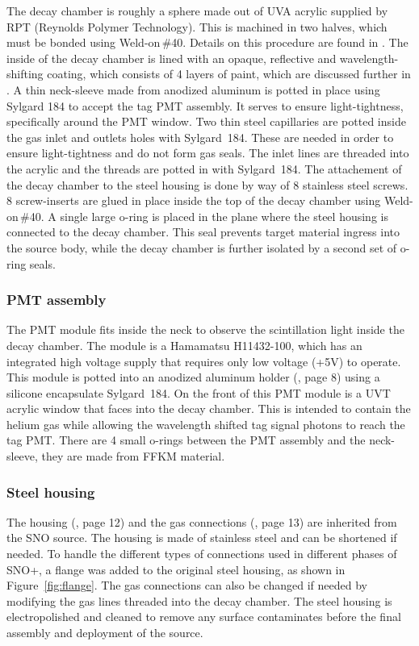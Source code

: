 The decay chamber is roughly a sphere made out of UVA acrylic supplied by RPT (Reynolds Polymer Technology). 
This is machined in two halves, which must be bonded using Weld-on\,\#40. Details on this procedure are found in .
The inside of the decay chamber is lined with an opaque, reflective and wavelength-shifting coating, which consists of 4 layers of paint, which are discussed further in .
A thin neck-sleeve made from anodized aluminum is potted in place using Sylgard 184 to accept the tag PMT assembly. 
It serves to ensure light-tightness, specifically around the PMT window.
Two thin steel capillaries are potted inside the gas inlet and outlets holes with Sylgard~184. These are needed in order to ensure light-tightness and do not form gas seals. The inlet lines are threaded into the acrylic and the threads are potted in with Sylgard~184. 
The attachement of the decay chamber to the steel housing is done by way of 8 stainless steel screws. 8 screw-inserts are glued in place inside the top of the decay chamber using Weld-on\,\#40.
A single large o-ring is placed in the plane where the steel housing is connected to the decay chamber. 
This seal prevents target material ingress into the source body, while the decay chamber is further isolated by a second set of o-ring seals.

\subsubsection{PMT assembly}

The PMT module fits inside the neck to observe the scintillation light inside the decay chamber. 
The module is a Hamamatsu H11432-100, which has an integrated high voltage supply that requires only low voltage (+5V) to operate. 
This module is potted into an anodized aluminum holder (\cite{wallig:2015}, page 8) using a silicone encapsulate Sylgard~184. 
On the front of this PMT module is a UVT acrylic window that faces into the decay chamber. This is intended to contain the helium gas while allowing the wavelength shifted tag signal photons to reach the tag PMT.
There are 4 small o-rings between the PMT assembly and the neck-sleeve, they are made from FFKM material.

\subsubsection{Steel housing}
The housing (\cite{wallig:2015}, page 12) and the gas connections (\cite{wallig:2015}, page 13) are inherited from the SNO \Li source. 
The housing is made of stainless steel and can be shortened if needed. 
To handle the different types of connections used in different phases of SNO+, a flange was added to the original steel housing, as shown in Figure~\ref{fig:flange}. 
The gas connections can also be changed if needed by modifying the gas lines threaded into the decay chamber.
The steel housing is electropolished and cleaned to remove any surface contaminates before the final assembly and deployment of the source.

